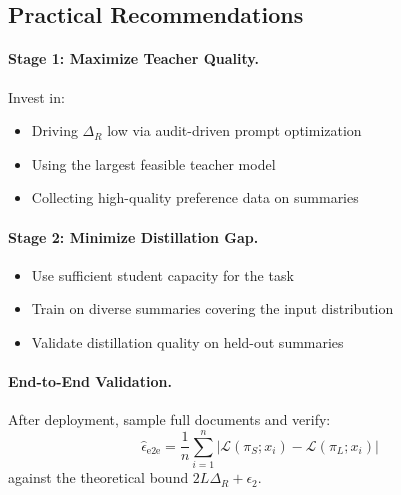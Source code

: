 \subsection{Practical Recommendations}

\paragraph{Stage 1: Maximize Teacher Quality.}
Invest in:
\begin{itemize}[nosep]
    \item Driving $\Delta_R$ low via audit-driven prompt optimization
    \item Using the largest feasible teacher model
    \item Collecting high-quality preference data on summaries
\end{itemize}

\paragraph{Stage 2: Minimize Distillation Gap.}
\begin{itemize}[nosep]
    \item Use sufficient student capacity for the task
    \item Train on diverse summaries covering the input distribution
    \item Validate distillation quality on held-out summaries
\end{itemize}

\paragraph{End-to-End Validation.}
After deployment, sample full documents and verify:
\[
\hat{\epsilon}_{\text{e2e}} = \frac{1}{n} \sum_{i=1}^n |\mathcal{L}(\pi_S; x_i) - \mathcal{L}(\pi_L; x_i)|
\]
against the theoretical bound $2L\Delta_R + \epsilon_2$.
